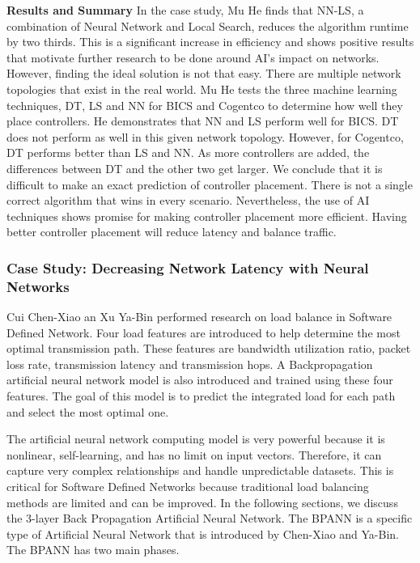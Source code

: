 \documentclass[conference]{IEEEtran}
\begin{document}
\textbf{Results and Summary}
In the case study, Mu He finds that NN-LS, a combination of Neural Network and Local Search, reduces the algorithm runtime by two thirds. This is a significant increase in efficiency and shows positive results that motivate further research to be done around AI’s impact on networks. However, finding the ideal solution is not that easy. There are multiple network topologies that exist in the real world. Mu He tests the three machine learning  techniques, DT, LS and NN for BICS and Cogentco to determine how well they place controllers. He demonstrates that NN and LS perform well for BICS. DT does not perform as well in this given network topology. However, for Cogentco, DT performs better than LS and NN. As more controllers are added, the differences between DT and the other two get larger. We conclude that it is difficult to make an exact prediction of controller placement. There is not a single correct algorithm that wins in every scenario. Nevertheless, the use of AI techniques shows promise for making controller placement more efficient. Having better controller placement will reduce latency and balance traffic. 

\subsubsection*{Case Study: Decreasing Network Latency with Neural Networks }

Cui Chen-Xiao an Xu Ya-Bin performed research on load balance in Software Defined Network. Four load features are introduced to help determine the most optimal transmission path. These features are bandwidth utilization ratio, packet loss rate, transmission latency and transmission hops\cite{Chen-Xiao_Ya-bin_2016}. A Backpropagation artificial neural network model is also introduced and trained using these four features. The goal of this model is to predict the integrated load for each path and select the most optimal one.


The artificial neural network computing model is very powerful because it is nonlinear, self-learning, and has no limit on input vectors. Therefore, it can capture very complex relationships and handle unpredictable datasets. This is critical for Software Defined Networks because traditional load balancing methods are limited and can be improved. In the following sections, we discuss the 3-layer Back Propagation Artificial Neural Network. The BPANN is a specific type of Artificial Neural Network that is introduced by Chen-Xiao and Ya-Bin. The BPANN has two main phases.
\end{document}
